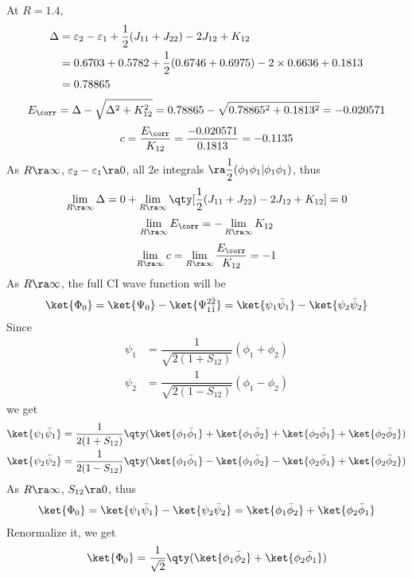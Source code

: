 \documentclass[a4paper]{article}
\begin{document}
At $ R = 1.4 $,
\begin{align}
\Delta &= \varepsilon_2 - \varepsilon_1 + \dfrac{1}{2}(J_{11} + J_{22}) - 2J_{12} + K_{12} \notag\\
&= 0.6703 + 0.5782 + \dfrac{1}{2}(0.6746 + 0.6975) - 2\times 0.6636 + 0.1813 \notag\\
&= 0.78865
\end{align}
\begin{align}
E_{\corr} = \Delta - \sqrt{\Delta^2 + K_{12}^2} = 0.78865 - \sqrt{0.78865^2 + 0.1813^2} = -0.020571
\end{align}
\begin{equation}\label{key}
c = \dfrac{E_{\corr}}{K_{12}} = \dfrac{-0.020571}{0.1813} = -0.1135
\end{equation}
As $ R\ra\infty $, $ \varepsilon_2 - \varepsilon_1 \ra 0 $, all 2e integrals $ \ra \dfrac{1}{2}(\phi_1\phi_1|\phi_1\phi_1) $, thus
\begin{align}
\lim\limits_{R\ra\infty}\Delta = 0 + \lim\limits_{R\ra\infty} \qty[\dfrac{1}{2}(J_{11} + J_{22}) - 2J_{12} + K_{12}] = 0
\end{align}
\begin{equation}\label{key}
\lim\limits_{R\ra\infty} E_{\corr} =  -\lim\limits_{R\ra\infty} K_{12}
\end{equation}
\begin{equation}\label{key}
\lim\limits_{R\ra\infty} c = \lim\limits_{R\ra\infty} \dfrac{E_{\corr}}{K_{12}} = -1
\end{equation}
As $ R\ra\infty $, the full CI wave function will be
\begin{equation}\label{key}
\ket{\Phi_0} = \ket{\Psi_0} - \ket{\Psi_{1\bar{1}}^{2\bar{2}}} = \ket{\psi_1\bar\psi_1} - \ket{\psi_2\bar\psi_2}
\end{equation}
Since
\begin{align}
\psi_1 &= \dfrac{1}{\sqrt{2(1 + S_{12})}}(\phi_1 + \phi_2) \\
\psi_2 &= \dfrac{1}{\sqrt{2(1 - S_{12})}}(\phi_1 - \phi_2)
\end{align}
we get
\begin{align}
\ket{\psi_1\bar\psi_1} &= \dfrac{1}{2(1 + S_{12})} \qty(\ket{\phi_1\bar\phi_1} + \ket{\phi_1\bar\phi_2} + \ket{\phi_2\bar\phi_1} + \ket{\phi_2\bar\phi_2}) \\
\ket{\psi_2\bar\psi_2} &= \dfrac{1}{2(1 - S_{12})} \qty(\ket{\phi_1\bar\phi_1} - \ket{\phi_1\bar\phi_2} - \ket{\phi_2\bar\phi_1} + \ket{\phi_2\bar\phi_2})
\end{align}
As $ R\ra\infty $, $ S_{12}\ra 0 $, thus
\begin{align}
\ket{\Phi_0} = \ket{\psi_1\bar\psi_1} - \ket{\psi_2\bar\psi_2} = \ket{\phi_1\bar\phi_2} + \ket{\phi_2\bar\phi_1}
\end{align}
Renormalize it, we get
\begin{equation}\label{key}
\ket{\Phi_0} = \dfrac{1}{\sqrt{2}}\qty(\ket{\phi_1\bar\phi_2} + \ket{\phi_2\bar\phi_1})
\end{equation}
\end{document}
